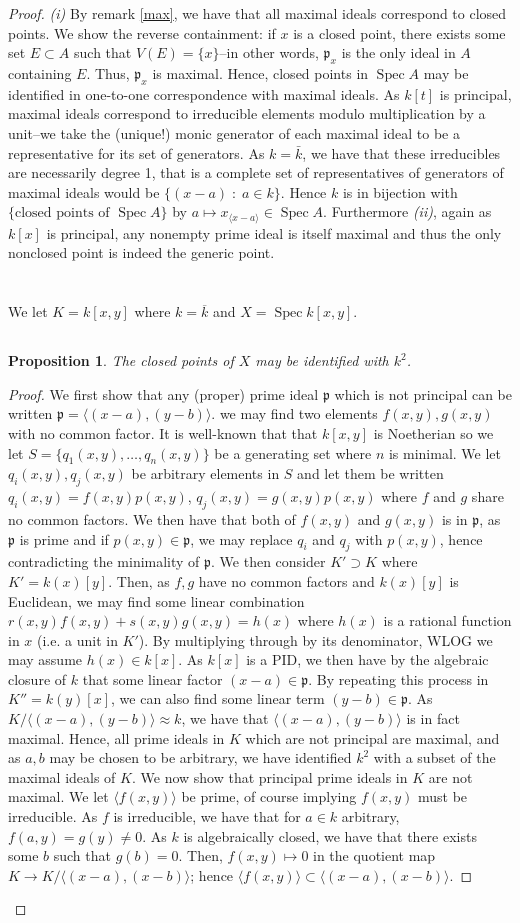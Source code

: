 \documentclass[english]{article}
\DeclareMathOperator{\spec}{Spec}
\newcommand{\pfr}{\mathfrak{p}}
\newcommand{\prob}[1]{\setcounter{section}{#1-1}\section{}}
\newcommand{\prt}[1]{\setcounter{subsection}{#1-1}\subsection{}}
\newtheorem*{proposition*}{Proposition}
\theoremstyle{remark}
\theoremstyle{definition}
\newcommand{\idl}[1]{\langle #1 \rangle}
\newcommand{\cl}{\overline}
\begin{document}
\begin{proof}
	\emph{(i)} By remark \ref{max}, we have that all maximal ideals correspond to closed points. We show the reverse containment: if $x$ is a closed point, there exists some set $E\subset A$ such that $V(E)=\{x\}$--in other words, $\pfr_x$ is the only ideal in $A$ containing $E$. Thus, $\pfr_x$ is maximal. Hence, closed points in $\spec A$ may be identified in one-to-one correspondence with maximal ideals. As $k[t]$ is principal, maximal ideals correspond to irreducible elements modulo multiplication by a unit--we take the (unique!) monic generator of each maximal ideal to be a representative for its set of generators. As $k=\bar k$, we have that these irreducibles are necessarily degree 1, that is a complete set of representatives of generators of maximal ideals would be $\{(x-a)\;:\; a\in k\}$. Hence $k$ is in bijection with $\{\text{closed points of }\spec A\}$ by $a\mapsto x_{\idl{x-a}}\in \spec A$. Furthermore \emph{(ii)}, again as $k[x]$ is principal, any nonempty prime ideal is itself maximal and thus the only nonclosed point is indeed the generic point.
	\prob{5} We let $K=k[x,y]$ where $k=\cl{k}$ and $X=\spec k[x,y]$.
	\prt{1}
	\begin{proposition*}
		The closed points of $X$ may be identified with $k^2$.
	\end{proposition*}
\begin{proof}
	We first show that any (proper) prime ideal $\pfr$ which is not principal can be written $\pfr=\idl{(x-a),(y-b)}$. we may find two elements $f(x,y), g(x,y)$ with no common factor. It is well-known that that $k[x,y]$ is Noetherian so we let $S=\{q_1(x,y),\hdots,q_n(x,y)\}$ be a generating set where $n$ is minimal. We let $q_i(x,y),q_j(x,y)$ be arbitrary elements in $S$ and let them be written $q_i(x,y)=f(x,y)p(x,y)$, $q_j(x,y)=g(x,y)p(x,y)$ where $f$ and $g$ share no common factors. We then have that both of $f(x,y)$ and $g(x,y)$ is in $\pfr$, as $\pfr$ is prime and if $p(x,y)\in \pfr$, we may replace $q_i$ and $q_j$ with $p(x,y)$, hence contradicting the minimality of $\pfr$. We then consider $K'\supset K$ where $K'=k(x)[y]$. Then, as $f,g$ have no common factors and $k(x)[y]$ is Euclidean, we may find some linear combination $r(x,y)f(x,y)+s(x,y)g(x,y)=h(x)$ where $h(x)$ is a rational function in $x$ (i.e. a unit in $K'$). By multiplying through by its denominator, WLOG we may assume $h(x)\in k[x]$. As $k[x]$ is a PID, we then have by the algebraic closure of $k$ that some linear factor $(x-a)\in \pfr$. By repeating this process in $K''=k(y)[x]$, we can also find some linear term $(y-b)\in \pfr$. As $K/\idl{(x-a),(y-b)}\approx k$, we have that $\idl{(x-a),(y-b)}$ is in fact maximal. Hence, all prime ideals in $K$ which are not principal are maximal, and as $a,b$ may be chosen to be arbitrary, we have identified $k^2$ with a subset of the maximal ideals of $K$. We now show that principal prime ideals in $K$ are not maximal. We let $\idl{f(x,y)}$ be prime, of course implying $f(x,y)$ must be irreducible. As $f$ is irreducible, we have that for $a\in k$ arbitrary, $f(a,y)=g(y)\neq 0$. As $k$ is algebraically closed, we have that there exists some $b$ such that $g(b)=0$. Then, $f(x,y)\mapsto 0$ in the quotient map $K\to K/\idl{(x-a),(x-b)}$; hence $\idl{f(x,y)}\subset \idl{(x-a),(x-b)}$. 

\end{proof}
\end{proof}
\end{document}
